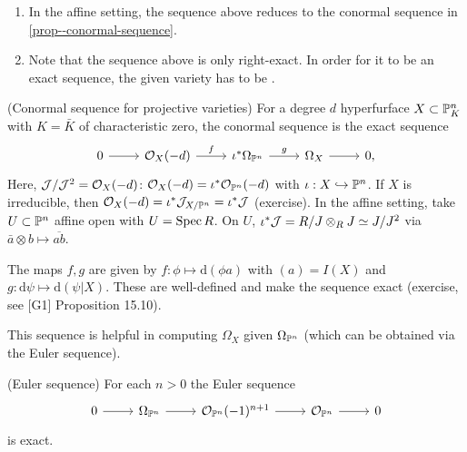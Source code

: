 \documentclass[a4paper,11pt]{article}
\begin{document}
			\begin{remark}
				\begin{enumerate}
					\item In the affine setting, the sequence above reduces to the conormal sequence in \autoref{prop--conormal-sequence}.
					\item Note that the sequence above is only right-exact. In order for it to be an exact sequence, the given variety has to be .
				\end{enumerate}
			\end{remark}

			\begin{eg}
				(Conormal sequence for projective varieties) For a degree $d$ hyperfurface $X\subset\P^n_K$ with $K=\bar{K}$ of characteristic zero, the conormal sequence is the exact sequence
				\begin{equation*}
					\begin{tikzcd}
						0\ar[r] & \O_X(-d)\ar[r,"f"] & \iota^\ast\Omega_{\P^n}\ar[r,"g"] & \Omega_X\ar[r] & 0,
					\end{tikzcd}
				\end{equation*}
				Here, $\J/\J^2=\O_X(-d)$: $\O_X(-d)=\iota^\ast\O_{\P^n}(-d)$ with $\iota:X\hookrightarrow\P^n$. If $X$ is irreducible, then $\O_X(-d)=\iota^\ast\J_{X/\P^n}=\iota^\ast\J$ (exercise). In the affine setting, take $U\subset\P^n$ affine open with $U=\spec R$. On $U$, $\iota^\ast\J=R/J\otimes_R J\simeq J/J^2$ via $\bar{a}\otimes b\mapsto\overline{ab}$.

				The maps $f,g$ are given by $f:\phi\mapsto\mathrm{d}(\phi a)$ with $(a)=I(X)$ and $g:\mathrm{d}\psi\mapsto\mathrm{d}(\psi|X)$. These are well-defined and make the sequence exact (exercise, see [G1] Proposition 15.10).
				
				This sequence is helpful in computing $\Omega_X$ given $\Omega_{\P^n}$ (which can be obtained via the Euler sequence).
			\end{eg}

			\begin{prop}
				(Euler sequence) For each $n>0$ the Euler sequence
				\begin{equation*}
					\begin{tikzcd}
						0\ar[r] & \Omega_{\P^n}\ar[r] & \O_{\P^n}(-1)^{n+1}\ar[r] & \O_{\P^n}\ar[r] & 0
					\end{tikzcd}
				\end{equation*}
				is exact.
			\end{prop}
\end{document}
